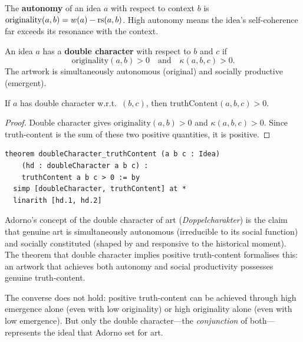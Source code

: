 \begin{definition}
\label{def:autonomy}
The \textbf{autonomy} of an idea $a$ with respect to context $b$ is
$\mathrm{originality}(a, b) = w(a) - \mathrm{rs}(a, b)$.
High autonomy means the idea's self-coherence far exceeds its resonance
with the context.
\end{definition}

\begin{definition}
\label{def:double-character}
An idea $a$ has a \textbf{double character} with respect to $b$ and $c$ if
\[
  \mathrm{originality}(a, b) > 0
  \quad \text{and} \quad
  \kappa(a, b, c) > 0.
\]
The artwork is simultaneously autonomous (original) and socially
productive (emergent).
\end{definition}

\begin{theorem}
\label{thm:double-truth}
If $a$ has double character w.r.t.\ $(b, c)$, then
$\mathrm{truthContent}(a, b, c) > 0$.
\end{theorem}

\begin{proof}
Double character gives $\mathrm{originality}(a, b) > 0$ and
$\kappa(a, b, c) > 0$.  Since truth-content is the sum of these two
positive quantities, it is positive.
\end{proof}

\begin{lstlisting}
theorem doubleCharacter_truthContent (a b c : Idea)
    (hd : doubleCharacter a b c) :
    truthContent a b c > 0 := by
  simp [doubleCharacter, truthContent] at *
  linarith [hd.1, hd.2]
\end{lstlisting}

\begin{interpretation}
\label{int:double-adorno}
Adorno's concept of the double character of art (\emph{Doppelcharakter})
is the claim that genuine art is simultaneously autonomous (irreducible
to its social function) and socially constituted (shaped by and responsive
to the historical moment).  The theorem that double character implies
positive truth-content formalises this: an artwork that achieves both
autonomy and social productivity possesses genuine truth-content.

The converse does not hold: positive truth-content can be achieved through
high emergence alone (even with low originality) or high originality alone
(even with low emergence).  But only the double character---the
\emph{conjunction} of both---represents the ideal that Adorno set for art.
\end{interpretation}

